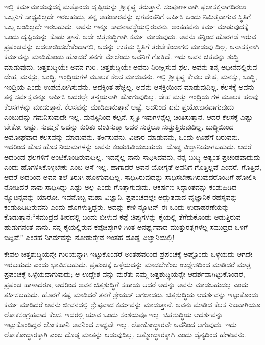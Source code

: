 ಇಲ್ಲಿ ಕರ್ಮಮಾಡುವುದಕ್ಕೆ ಮತ್ತೊಂದು ದೃಷ್ಟಿಯನ್ನು ಶ‍್ರೀಕೃಷ್ಣ ತರುತ್ತಾನೆ. ಸಂಪೂರ್ಣವಾಗಿ ಫಲಾಸಕ್ತನಾಗದಿರಲು ಒಬ್ಬನಿಗೆ ಸಾಧ್ಯವಿಲ್ಲದೇ ಇರಬಹುದು, ತನ್ನ ಅಹಂಕಾರವನ್ನು ಭಗವಂತನಿಗೆ ಅರ್ಪಿಸಿ ಒಂದು ನಿಮಿತ್ತವಾಗುವ ಸ್ಥಿತಿಗೆ ಒಬ್ಬ ಬಂದಿಲ್ಲದೇ ಇರಬಹುದು. ಅವನು ಇನ್ನೂ ಸಾಧನಾವಸ್ಥೆಯಲ್ಲಿರುವನು. ಅಂತಹವನು ಕರ್ಮ ಮಾಡುವುದಕ್ಕೆ ಒಂದು ದೃಷ್ಟಿಯನ್ನು ಕೊಡು ತ್ತಾನೆ. ಅದೇ ಚಿತ್ತಶುದ್ಧಿಗಾಗಿ ಕರ್ಮ ಮಾಡುವುದು. ಅವನು ತನ್ನಿಂದ ಹೊರಗಡೆ ಇರುವ ಪ್ರಪಂಚವನ್ನು ಬದಲಾಯಿಸಬೇಕೆಂದಾಗಲಿ, ಅದನ್ನು ಉತ್ತಮ ಸ್ಥಿತಿಗೆ ತರಬೇಕೆಂದಾಗಲಿ ಮಾಡುವು ದಿಲ್ಲ. ಅನಾಸಕ್ತನಾಗಿ ಕರ್ಮವನ್ನು ಮಾಡಿಕೊಂಡು ಹೋದರೆ ತನಗೇ ಮೇಲೆಂದು ಅವನಿಗೆ ಗೊತ್ತಿದೆ. ಇದು ಅವನ ಚಿತ್ತವನ್ನು ಶುದ್ಧಿ ಮಾಡುವುದು. ಚಿತ್ತಶುದ್ಧಿಯೇ ಅವನ ಗುರಿ. ಚಿತ್ತಶುದ್ಧಿಯೇ ಅವನು ನಿರೀಕ್ಷಿಸುವ ಫಲ. ಅವನು ತನ್ನ ಅಧೀನದಲ್ಲಿರುವ ದೇಹ, ಮನಸ್ಸು, ಬುದ್ಧಿ, ಇಂದ್ರಿಯಗಳ ಮೂಲಕ ಕೆಲಸ ಮಾಡುವನು. ಇಲ್ಲಿ ಶ‍್ರೀಕೃಷ್ಣ ಕೇವಲ ದೇಹ, ಮನಸ್ಸು, ಬುದ್ಧಿ, ಇಂದ್ರಿಯ ಎಂದು ಉಪಯೋಗಿಸುವನು. ಅದಕ್ಕಿಂತ ಹೆಚ್ಚಿಲ್ಲ. ಅವನು ಆಸಕ್ತಿಯಿಂದ ಮಾಡುವುದಿಲ್ಲ. ಕೆಲಸಕ್ಕೆ ಅವನು ತನ್ನ ಸರ್ವಸ್ವವನ್ನೂ ಅರ್ಪಿಸಿ ಅದರಲ್ಲೇ ತನ್ಮಯನಾಗಿ ಹೋಗುವುದಿಲ್ಲ. ದೇಹ ಮತ್ತು ಇಂದ್ರಿಯ ಗಳ ಮೂಲಕ ಹಲವು ಕೆಲಸಗಳನ್ನು ಮಾಡುತ್ತಾನೆ. ಕೆಲಸವನ್ನು ಮಾಡಿಹಾಕುತ್ತಾನೆ ಅಷ್ಟೆ. ಅದರಿಂದ ಏನು ಪ್ರಯೋಜನವಾಗುವುದು ಎಂಬುದನ್ನು ಗಮನಿಸುವುದೇ ಇಲ್ಲ. ಮನಸ್ಸಿನಿಂದ ಕಲ್ಪನೆ, ಸ್ಮೃತಿ ಇವುಗಳನ್ನೆಲ್ಲ ಚಿಂತಿಸುತ್ತಾನೆ. ಆದರೆ ಕೆಲಸಕ್ಕೆ ಎಷ್ಟು ಬೇಕೋ ಅಷ್ಟು. ಸುಮ್ಮನೆ ಅದನ್ನು ಕುರಿತು ಚಿಂತಿಸುತ್ತಾ ಅದರ ಸುತ್ತಲೂ ಸುತ್ತುತ್ತಿರುವುದಿಲ್ಲ. ಬುದ್ಧಿಯಿಂದ ಅಮೋಘವಾದ ಕೆಲಸವನ್ನು ಮಾಡುವನು. ತರ್ಕಿಸುವನು, ವಿಚಾರ ಮಾಡುವನು, ಒಂದು ಊಹೆಗೆ ಬರುವನು. ಇದರಿಂದ ಹೊಸ ಹೊಸ ನಿಯಮಗಳನ್ನು ಅವನು ಕಂಡುಹಿಡಿಯಬಹುದು. ದೊಡ್ಡ ವಿಜ್ಞಾನಿಯಾಗಬಹುದು. ಆದರೆ ಅದರಿಂದ ಫಲಗಳಿಗೆ ಅಂಟಿಕೊಂಡಿರುವುದಿಲ್ಲ. ಇದನ್ನೆಲ್ಲ ನಾನು ಸಾಧಿಸಿದವನು, ನನ್ನ ಬುದ್ಧಿ ಅತ್ಯಂತ ಪ್ರಚಂಡವಾದುದು ಎಂದು ಹೊಗಳಿಸಿಕೊಳ್ಳಬೇಕು ಎಂಬ ಆಸೆ ಇಲ್ಲ. ಹಾಗಾದರೆ ಅವನ ಯೋಗ್ಯತೆ ಅವನಿಗೆ ಗೊತ್ತಿಲ್ಲವೆ ಎಂದರೆ, ಗೊತ್ತಿದೆ, ಆದರೆ ಅದರಿಂದ ಅವನ ತಲೆ ತಿರುಗಿ ಹೋಗುವುದಿಲ್ಲ. ಸಾಧಿಸಿರುವುದನ್ನು ಸಾಧಿಸಬೇಕಾಗಿರುವುದರೊಂದಿಗೆ ಹೋಲಿಸಿ ನೋಡಿದರೆ ನಾವು ಸಾಧಿಸಿದ್ದು ಎಷ್ಟು ಅಲ್ಪ ಎಂದು ಗೊತ್ತಾಗುವುದು. ಆಕರ್ಷಣ ಸಿದ್ಧಾಂತವನ್ನು ಕಂಡುಹಿಡಿದ ನ್ಯೂಟನ್ನನನ್ನು ಯಾರೋ, ಇವನೊಬ್ಬ ಮಹಾ ವಿಜ್ಞಾನಿ, ಪ್ರಪಂಚದಲ್ಲೇ ಅದ್ಭುತವಾದ ವೈಜ್ಞಾನಿಕ ರಹಸ್ಯವನ್ನು ಕಂಡುಹಿಡಿದಿರುವನು ಎಂದು ಹೊಗಳುತ್ತಿದ್ದರು. ಅದನ್ನು ಕೇಳಿ ನ್ಯೂಟನ್ ಈ ಒಂದು ಉದಾಹರಣೆಯನ್ನು ಕೊಡುತ್ತಾನೆ:“ಸಮುದ್ರದ ತೀರದಲ್ಲಿ ಬಂದು ಬೀಳುವ ಕಪ್ಪೆ ಚಿಪ್ಪುಗಳನ್ನು ಕೈಯಲ್ಲಿ ತೆಗೆದುಕೊಂಡು ಆಡುತ್ತಿರುವ ಹುಡುಗನಂತೆ ನಾನು. ನನ್ನ ಕೈಯಲ್ಲಿರುವ ಕಪ್ಪೆಚಿಪ್ಪುಗಳಿ ಗಿಂತ ಅನರ್ಘ್ಯವಾದ ಮುತ್ತುರತ್ನಗಳೆಲ್ಲ ಸಮುದ್ರದ ಒಳಗೆ ಬಿದ್ದಿವೆ.” ಎಂತಹ ನಿಗರ್ವವನ್ನು ನೋಡುತ್ತೇವೆ ಇಂತಹ ದೊಡ್ಡ ವಿಜ್ಞಾನಿಯಲ್ಲಿ!

ಕೇವಲ ಚಿತ್ತಶುದ್ಧಿಯನ್ನೇ ಗುರಿಯನ್ನಾಗಿ ಇಟ್ಟುಕೊಂಡರೆ ಅಂತಹವರಿಂದ ಪ್ರಪಂಚಕ್ಕೆ ಅಷ್ಟೊಂದು ಒಳ್ಳೆಯದು ಆಗದೇ ಇರಬಹುದು ಎಂದು ಭಾವಿಸಬಹುದು. ಪ್ರಪಂಚಕ್ಕೆ ಒಳ್ಳೆಯದನ್ನು ಮಾಡಬೇಕೆಂಬ ಉದ್ದೇಶದಿಂದ ಮಾಡಿದರೆ ಮಾತ್ರ ಪ್ರಪಂಚಕ್ಕೆ ಒಳ್ಳೆಯದಾಗುವುದು; ಆ ಉದ್ದೇಶ ವನ್ನು ಮರೆತು ನಮ್ಮ ಚಿತ್ತಶುದ್ಧಿಯನ್ನೇ ಆದರ್ಶವಾಗಿಟ್ಟುಕೊಂಡರೆ, ಪ್ರಪಂಚ ಹಾಳಾದರೂ, ಅದರಿಂದ ಅವನ ಚಿತ್ತಶುದ್ಧಿಗೆ ಸಹಾಯ ಆದರೆ ಅದನ್ನು ಅವನು ಮಾಡಬಹುದಲ್ಲ ಎಂದು ತರ್ಕಿಸಬಹುದು. ಹೊರಗೆ ನಷ್ಟ ಮಾಡಿದರೆ ತನಗೆ ಶ್ರೇಯಸ್ ಆಗಲಾದರು. ಚಿತ್ತಶುದ್ಧಿಯ ಆದರ್ಶವನ್ನು ಇಟ್ಟುಕೊಂಡು ಕರ್ಮ ಮಾಡಿದರೆ ಅವನು ಜೀವನದಲ್ಲಿ ಶ್ರೇಷ್ಠವಾದ ಕರ್ಮವನ್ನು ಮಾಡುತ್ತಾನೆ. ಅವನು ಮಾಡಿದ ಕೆಲಸ ನಿಜವಾಗಿಯೂ ಲೋಕಸಂಗ್ರಹವಾದ ಕೆಲಸ. ಇದರಲ್ಲಿ ಯಾವ ಒಂದು ಸಂಶಯವೂ ಇಲ್ಲ. ಚಿತ್ತಶುದ್ಧಿಯ ಆದರ್ಶವನ್ನು ಇಟ್ಟುಕೊಂಡಿದ್ದರೆ ಲೋಕಹಾನಿ ಅವನಿಂದ ಸಾಧ್ಯವೇ ಇಲ್ಲ. ಲೋಕೋದ್ಧಾರವೇ ಅವನಿಂದ ಆಗುವುದು. ಇದು ಲೋಕೋದ್ಧಾರಕ್ಕಾಗಿ ಎಂಬ ದೊಡ್ಡ ಮಾತನ್ನು ಆಡುವುದಿಲ್ಲ. ಆತ್ಮೋದ್ಧಾರಕ್ಕಾಗಿ ಎಂದು ದೈನ್ಯದಿಂದ ಹೇಳುವನು.


